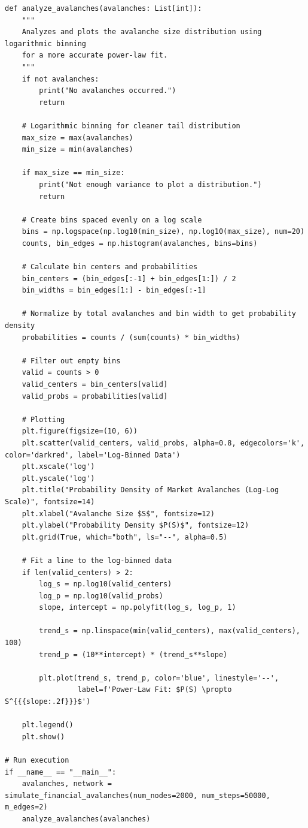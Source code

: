 \documentclass[final,5p,times,twocolumn,authoryear]{elsarticle}
\begin{document}
\begin{lstlisting}[caption={Optimized Python Simulation of Financial Self-Organized Criticality}, label={code:simulation}]
def analyze_avalanches(avalanches: List[int]):
    """
    Analyzes and plots the avalanche size distribution using logarithmic binning
    for a more accurate power-law fit.
    """
    if not avalanches:
        print("No avalanches occurred.")
        return

    # Logarithmic binning for cleaner tail distribution
    max_size = max(avalanches)
    min_size = min(avalanches)
    
    if max_size == min_size:
        print("Not enough variance to plot a distribution.")
        return

    # Create bins spaced evenly on a log scale
    bins = np.logspace(np.log10(min_size), np.log10(max_size), num=20)
    counts, bin_edges = np.histogram(avalanches, bins=bins)
    
    # Calculate bin centers and probabilities
    bin_centers = (bin_edges[:-1] + bin_edges[1:]) / 2
    bin_widths = bin_edges[1:] - bin_edges[:-1]
    
    # Normalize by total avalanches and bin width to get probability density
    probabilities = counts / (sum(counts) * bin_widths)
    
    # Filter out empty bins
    valid = counts > 0
    valid_centers = bin_centers[valid]
    valid_probs = probabilities[valid]

    # Plotting
    plt.figure(figsize=(10, 6))
    plt.scatter(valid_centers, valid_probs, alpha=0.8, edgecolors='k', color='darkred', label='Log-Binned Data')
    plt.xscale('log')
    plt.yscale('log')
    plt.title("Probability Density of Market Avalanches (Log-Log Scale)", fontsize=14)
    plt.xlabel("Avalanche Size $S$", fontsize=12)
    plt.ylabel("Probability Density $P(S)$", fontsize=12)
    plt.grid(True, which="both", ls="--", alpha=0.5)
    
    # Fit a line to the log-binned data
    if len(valid_centers) > 2:
        log_s = np.log10(valid_centers)
        log_p = np.log10(valid_probs)
        slope, intercept = np.polyfit(log_s, log_p, 1)
        
        trend_s = np.linspace(min(valid_centers), max(valid_centers), 100)
        trend_p = (10**intercept) * (trend_s**slope)
        
        plt.plot(trend_s, trend_p, color='blue', linestyle='--', 
                 label=f'Power-Law Fit: $P(S) \propto S^{{{slope:.2f}}}$')
                 
    plt.legend()
    plt.show()

# Run execution
if __name__ == "__main__":
    avalanches, network = simulate_financial_avalanches(num_nodes=2000, num_steps=50000, m_edges=2)
    analyze_avalanches(avalanches)
\end{lstlisting}
\end{document}
